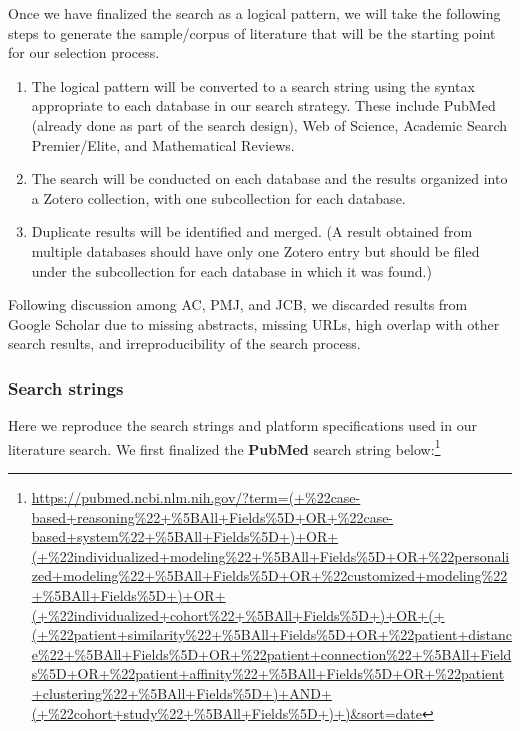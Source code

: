 \documentclass[preprint, 3p,
authoryear]{elsarticle} %
\providecommand{\tightlist}{%
  \setlength{\itemsep}{0pt}\setlength{\parskip}{0pt}}
\begin{document}
Once we have finalized the search as a logical pattern, we will take the
following steps to generate the sample/corpus of literature that will be
the starting point for our selection process.

\begin{enumerate}
\def\labelenumi{\arabic{enumi}.}
\tightlist
\item
  The logical pattern will be converted to a search string using the
  syntax appropriate to each database in our search strategy. These
  include PubMed (already done as part of the search design), Web of
  Science, Academic Search Premier/Elite, and Mathematical Reviews.
\item
  The search will be conducted on each database and the results
  organized into a Zotero collection, with one subcollection for each
  database.
\item
  Duplicate results will be identified and merged. (A result obtained
  from multiple databases should have only one Zotero entry but should
  be filed under the subcollection for each database in which it was
  found.)
\end{enumerate}

Following discussion among AC, PMJ, and JCB, we discarded results from
Google Scholar due to missing abstracts, missing URLs, high overlap with
other search results, and irreproducibility of the search process.

\hypertarget{search-strings}{%
\subsubsection{Search strings}\label{search-strings}}

Here we reproduce the search strings and platform specifications used in
our literature search. We first finalized the \textbf{PubMed} search
string below:\footnote{\url{https://pubmed.ncbi.nlm.nih.gov/?term=(+\%22case-based+reasoning\%22+\%5BAll+Fields\%5D+OR+\%22case-based+system\%22+\%5BAll+Fields\%5D+)+OR+(+\%22individualized+modeling\%22+\%5BAll+Fields\%5D+OR+\%22personalized+modeling\%22+\%5BAll+Fields\%5D+OR+\%22customized+modeling\%22+\%5BAll+Fields\%5D+)+OR+(+\%22individualized+cohort\%22+\%5BAll+Fields\%5D+)+OR+(+(+\%22patient+similarity\%22+\%5BAll+Fields\%5D+OR+\%22patient+distance\%22+\%5BAll+Fields\%5D+OR+\%22patient+connection\%22+\%5BAll+Fields\%5D+OR+\%22patient+affinity\%22+\%5BAll+Fields\%5D+OR+\%22patient+clustering\%22+\%5BAll+Fields\%5D+)+AND+(+\%22cohort+study\%22+\%5BAll+Fields\%5D+)+)\&sort=date}}
\end{document}
